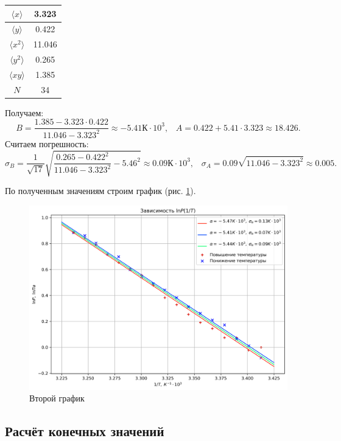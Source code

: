 \documentclass[a4paper,12pt]{article} %
\begin{document}
\begin{enumerate}
\begin{center}
\begin{tabular}{|c|c|}
\hline 
$\langle x \rangle$ & 3.323 \\ 
\hline 
$\langle y \rangle$ & 0.422 \\ 
\hline 
$\langle x^2 \rangle$ & 11.046 \\ 
\hline 
$\langle y^2 \rangle$ & 0.265 \\ 
\hline 
$\langle xy \rangle$ & 1.385 \\ 
\hline 
$N$ & 34 \\ 
\hline 
\end{tabular} 
\end{center}

Получаем:
\[
B = \frac{1.385 - 3.323 \cdot 0.422}{11.046 - 3.323^2} \approx -5.41 \text{К}\cdot 10^3, \;\;\;
A = 0.422 + 5.41 \cdot 3.323 \approx 18.426.
\]
Считаем погрешность:
\[
\sigma_B = \frac{1}{\sqrt{17}} \sqrt{\frac{0.265 - 0.422^2}{11.046 - 3.323^2} - 5.46^2} \approx 0.09 \text{К}\cdot 10^3, \;\;\; \sigma_A = 0.09 \sqrt{11.046 - 3.323^2} \approx 0.005.
\]


\end{enumerate}

По полученным значениям строим график (рис. \ref{fig:graph2}).

\begin{figure}
\begin{center}
\includegraphics[width=\textwidth]{graph2.png}
\end{center}
\caption{Второй	 график}
\label{fig:graph2}
\end{figure}

\subsection{Расчёт конечных значений}
\end{document}
